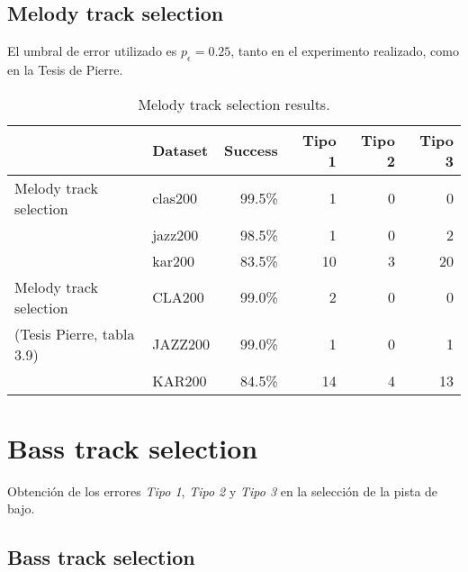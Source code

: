 \documentclass{llncs}
\begin{document}
\subsection{Melody track selection}

El umbral de error utilizado es $p_{\epsilon}=0.25$, tanto en el experimento realizado, como en
la Tesis de Pierre.

\begin{table}
\begin{center}
\begin{tabular}{ l | l | r | r | r | r }
\hline
   &   Dataset \hspace{0.5cm} &  \hspace{0.5cm} Success & \hspace{0.2cm} Tipo 1 & \hspace{0.2cm} Tipo 2 & \hspace{0.2cm} Tipo 3 \\
\hline
\hline
Melody track selection  &   clas200 	&	 99.5\%	&	 1 	&	 0 	&	 0 	 \\
                        &   jazz200 	&	 98.5\% &	 1 	&	 0 	&	 2 	 \\
                        &   kar200 	&	 83.5\%	&	 10 	&	 3 	&	 20 	 \\
\hline 
Melody track selection  &   CLA200	&	99.0\%	&	2	&	0	&	0	\\
(Tesis Pierre, tabla 3.9)&  JAZZ200	&	99.0\%	&	1	&	0	&	1	\\
                        &   KAR200	&	84.5\%	&	14	&	4	&	13	\\
\hline
\end{tabular}
\caption{Melody track selection results.}
\label{result2}
\end{center}
\end{table}






\section{Bass track selection}

Obtención de los errores \emph{Tipo 1}, \emph{Tipo 2} y \emph{Tipo 3} en la selección de la pista de bajo.


\subsection{Bass track selection}
\end{document}
